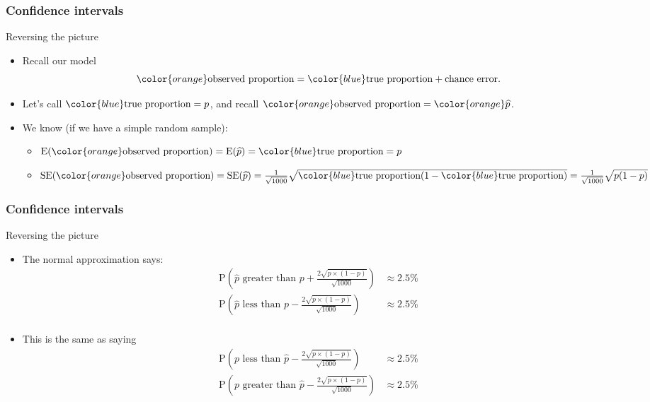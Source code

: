\documentclass[handout]{beamer}
\begin{document}
   \begin{frame} \frametitle{Confidence intervals}

   \begin{block}
   {Reversing the picture}
   \begin{itemize}
   \item Recall our model
   $$
   {\color{orange} \text{observed proportion}} = {\color{blue} \text{true proportion}} + \text{chance error}.
   $$
   \item Let's call ${\color{blue} \text{true proportion}=p}$, and recall
   ${\color{orange} \text{observed proportion}} = {\color{orange} \widehat{p}}$.
   \item We know (if we have a simple random sample):
   \begin{itemize}
   \item  $\text{E}({\color{orange} \text{observed proportion}}) = \text{E}({\widehat{p}}) = {\color{blue} \text{true proportion}}={ p}$
   \item  $\text{SE}({\color{orange} \text{observed proportion}}) = \text{SE}({ \widehat{p}}) =  \frac{1}{\sqrt{1000}} \sqrt{{\color{blue} \text{true proportion}}(1-{\color{blue} \text{true proportion}})} = \frac{1}{\sqrt{1000}} \sqrt{p(1-p)}$
   \end{itemize}
   \end{itemize}
   \end{block}
   \end{frame}


   \begin{frame} \frametitle{Confidence intervals}

   \begin{block}
   {Reversing the picture}
   \begin{itemize}
   \item The normal approximation says:
   $$
   \begin{aligned}
   \text{P} \left(\text{$\widehat{p}$ greater than $p + \frac{2\sqrt{p \times (1-p)}}{\sqrt{1000}}$}\right) &\approx 2.5\% \\
   \text{P} \left(\text{$\widehat{p}$ less than $p - \frac{2\sqrt{p \times (1-p)}}{\sqrt{1000}}$}\right) &\approx 2.5\% \\
   \end{aligned}
   $$
   \item This is the same as saying
   $$
   \begin{aligned}
   \text{P} \left(\text{$p$ less than $\widehat{p} - \frac{2\sqrt{p \times (1-p)}}{\sqrt{1000}}$}\right) &\approx 2.5\% \\
   \text{P} \left(\text{$p$ greater than $\widehat{p} - \frac{2\sqrt{p \times (1-p)}}{\sqrt{1000}}$}\right) &\approx 2.5\% \\
   \end{aligned}
   $$
   \end{itemize}
   \end{block}
   \end{frame}
\end{document}
